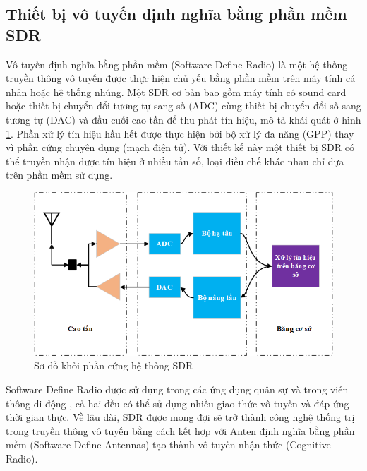 
\subsection{Thiết bị vô tuyến định nghĩa bằng phần mềm SDR}

Vô tuyến định nghĩa bằng phần mềm (Software Define Radio) là một hệ thống truyền thông vô tuyến được thực hiện chủ yếu bằng phần mềm trên máy tính cá nhân hoặc hệ thống nhúng. Một SDR cơ bản bao gồm máy tính có sound card  hoặc thiết bị chuyển đổi tương tự sang số (ADC) cùng thiết bị chuyển đổi số sang tương tự (DAC) và đầu cuối cao tần để thu phát tín hiệu, mô tả khái quát ở hình \ref{fig:structSDR}. Phần xử lý tín hiệu hầu hết được thực hiện bởi bộ xử lý đa năng (GPP) thay vì phần cứng chuyên dụng (mạch điện tử). Với thiết kế này một thiết bị SDR có thể truyền nhận được tín hiệu ở nhiều tần số,  loại điều chế khác nhau chỉ dựa trên phần mềm sử dụng.

\begin{figure} [!htb]
	\centering
	\includegraphics[width=1\linewidth]{figures/structSDR.png}
	\caption{Sơ đồ khối phần cứng hệ thống SDR}
	\label{fig:structSDR}
\end{figure}

Software Define Radio được sử dụng trong các ứng dụng quân sự \cite{Bergstrom2002} và trong viễn thông di động \cite{VanRijsbergen, Gomez-Miguelez2016}, cả hai đều có thể sử dụng nhiều giao thức vô tuyến và đáp ứng thời gian thực. Về lâu dài, SDR được mong đợi sẽ trở thành công nghệ thống trị trong truyền thông vô tuyến bằng cách kết hợp với Anten định nghĩa bằng phần mềm (Software Define Antennas) tạo thành vô tuyến nhận thức (Cognitive Radio).

